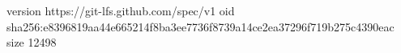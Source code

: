 version https://git-lfs.github.com/spec/v1
oid sha256:e8396819aa44e665214f8ba3ee7736f8739a14ce2ea37296f719b275c4390eac
size 12498
